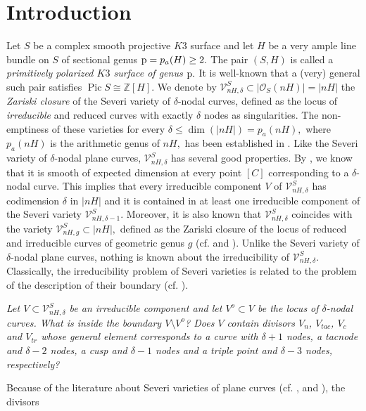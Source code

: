 \documentclass[plain]{amsart}
\def\Pic{\operatorname{Pic}}
\def\p{\rm{p}}
\def\d{\delta}
\begin{document}
\section{Introduction}
Let $S$ be a complex smooth projective $K3$ surface and let $H$ be a very ample 
line bundle on $S$ of sectional genus ${\p} =p_a(H) \geq 2.$ 
 The pair $(S,H)$ is called a {\it  primitively polarized 
$K3$ surface of genus $\p.$}  It is well-known that a (very) general such pair satisfies 
$\Pic S \cong \mathbb Z[H].$
We denote
by $\mathcal V_{nH,\delta}^S\subset |\mathcal O_S(nH)|=|nH|$ the {\it Zariski closure} of the Severi variety
of $\delta$-nodal curves, defined as the locus of
{\it irreducible} and reduced curves with exactly 
$\delta$ nodes as singularities. The non-emptiness of these varieties for every $\delta\leq\dim(|nH|)=p_a(nH),$ 
where $p_a(nH)$ is the arithmetic genus of $nH,$ has been established in \cite{C}.
Like the Severi variety of $\delta$-nodal plane curves, $\mathcal V_{nH,\delta}^S$
has several good properties.   By \cite{tan}, we know that  it
is smooth of expected dimension at every point $[C]$ corresponding to 
a $\d$-nodal curve. This implies that every irreducible component $V$ of $\mathcal V_{nH,\delta}^S$ has codimension
$\d$ in $|nH|$ and it is contained in at least one irreducible component of the Severi variety $\mathcal V_{nH,\delta-1}^S.$  
Moreover, it is also known that  $\mathcal V_{nH,\delta}^S$ coincides with the variety 
$\mathcal V_{nH,g}^S\subset |nH|,$ defined as the Zariski closure of the locus of reduced and irreducible curves of
geometric genus $g$ (cf. \cite[Lemma 3.1]{C} and \cite[Remark 2.6]{galati-knutsen}).  
Unlike the Severi variety of $\delta$-nodal plane curves, nothing is known about the irreducibility
of $\mathcal V_{nH,\delta}^S.$ Classically, the irreducibility problem of Severi varieties is related to the
problem of the description of their boundary (cf. \cite{harris}).  
\begin{trivlist}
\item[\hspace\labelsep{\bf  Problem 1}]
{\em Let $V\subset \mathcal V_{nH,\delta}^S$ be an irreducible component and  let 
$V^o\subset V$ be the locus of $\delta$-nodal curves. 
What is inside the boundary $V\setminus V^o$?  
 Does $V$  contain divisors 
$V_{n}$, $V_{tac}$, $V_{c}$ and $V_{tr}$ whose general element corresponds to a  
curve with $\delta+1$ nodes, a tacnode and $\delta-2$ nodes, a cusp and $\delta-1$
nodes and a triple point and $\delta-3$ nodes, respectively?}
\end{trivlist}
Because of the literature about Severi varieties of plane curves (cf. \cite{diaz_harris1}, \cite{diaz_harris2} and \cite{F}), the divisors 
\end{document}
